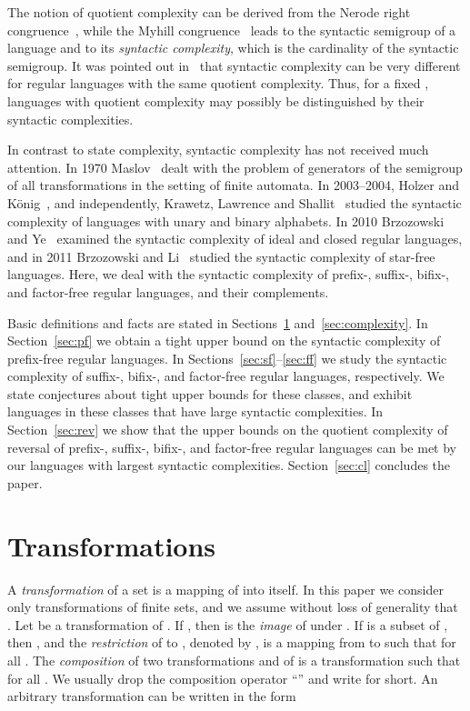 \documentclass{llncs}
\begin{document}
The notion of quotient complexity can be derived from the Nerode right congruence~\cite{Ner58}, 
while the Myhill congruence~\cite{Myh57} leads to the syntactic semigroup of a language and to its \emph{syntactic complexity}, which is the cardinality of the syntactic semigroup.
It was pointed out in~\cite{BrYe11} that syntactic complexity can be very different for regular languages with the same quotient complexity.
Thus, for a fixed , languages with quotient complexity  may possibly be distinguished by their syntactic complexities.

In contrast to state complexity, syntactic complexity has not received much attention. In 1970 Maslov~\cite{Mas70} dealt with the problem of generators of the semigroup of all transformations in the setting of finite automata. In 2003--2004, Holzer and K\"onig~\cite{HoKo04}, and independently, Krawetz, Lawrence and Shallit~\cite{KLS03} studied the syntactic complexity of languages with unary and binary alphabets. 
In 2010 Brzozowski and Ye~\cite{BrYe11} examined the syntactic complexity of ideal and closed regular languages, and in 2011 Brzozowski and Li~\cite{BL11} studied the syntactic complexity of star-free languages. 
Here, we deal with the syntactic complexity of  prefix-, suffix-, bifix-, and factor-free regular languages, and their complements.

Basic definitions and facts are stated in Sections~\ref{sec:trans} and~\ref{sec:complexity}. In Section~\ref{sec:pf} we obtain a tight upper bound on the syntactic complexity of prefix-free regular languages. In Sections~\ref{sec:sf}--\ref{sec:ff} we study the syntactic complexity of suffix-, bifix-, and factor-free regular languages, respectively.  We state conjectures about tight upper bounds for these classes, and exhibit languages in these classes that have large syntactic complexities.   In Section~\ref{sec:rev} we show that the upper bounds on the quotient complexity of reversal of prefix-, suffix-, bifix-, and factor-free regular languages can be met by our languages with largest syntactic complexities. Section~\ref{sec:cl} concludes the paper.


\section{Transformations}\label{sec:trans}

A {\em transformation} of a set  is a mapping of  into itself. In this paper we consider only transformations of finite sets, and we assume without loss of generality  that . Let  be a transformation of . If  , then  is the {\it image} of  under .  If  is a subset of , then , and the {\em restriction} of  to , denoted by , is a mapping from  to  such that  for all . The {\em composition} of two transformations  and  of  is a transformation  such that  for all . We usually drop the composition operator ``'' and write  for short. 
An arbitrary transformation can be written in the form
\end{document}
